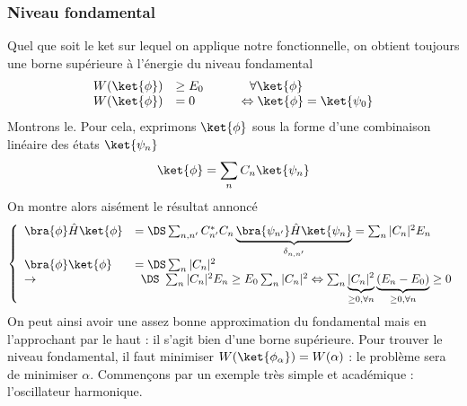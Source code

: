 		\subsubsection{Niveau fondamental}
		Quel que soit le ket sur lequel on applique notre fonctionnelle, on obtient toujours 
		une borne supérieure à l'énergie du niveau fondamental
		\begin{equation}
		\begin{array}{lll}
		W(\ket{\phi}) &\geq E_0&\qquad\ \  \forall\ket{\phi}\\
		W(\ket{\phi}) &=0 &\qquad\Leftrightarrow \ket{\phi}=\ket{\psi_0}
		\end{array}
		\end{equation}
		Montrons le. Pour cela, exprimons $\ket{\phi}$ sous la forme d'une combinaison linéaire des 
		états $\ket{\psi_n}$
		\begin{equation}
		\ket{\phi} = \sum_n C_n\ket{\psi_n}
		\end{equation}
		On montre alors aisément le résultat annoncé
		\begin{equation}
		\left\{\begin{array}{ll}
		\bra{\phi}\hat{H}\ket{\phi} &=\DS \sum_{n,n'} C_{n'}^*C_n 
		\underbrace{\bra{\psi_{n'}}\hat{H}\ket{\psi_n}}_{\delta_{n,n'}} = \sum_n |C_n|^2 E_n\\
		\bra{\phi}\ket{\phi} &=\DS \sum_n |C_n|^2\\
		\rightarrow &\phantom{0 }\DS\  \sum_n |C_n|^2 E_n \geq E_0\sum_n |C_n|^2 \Leftrightarrow \sum_n 
		\underbrace{|C_n|^2}_{\geq 0,\forall n}\underbrace{(E_n-E_0)}_{\geq 0,\forall n} \geq 0
		\end{array}\right.
		\end{equation}
		On peut ainsi avoir une assez bonne approximation du fondamental mais en l'approchant 
		par le haut : il s'agit bien d'une borne supérieure. Pour trouver le niveau fondamental, 
		il faut minimiser $W(\ket{\phi_\alpha}) = W(\alpha)$ : le problème sera de minimiser 
		$\alpha$. Commençons par un exemple très simple et académique : l'oscillateur harmonique.
		

